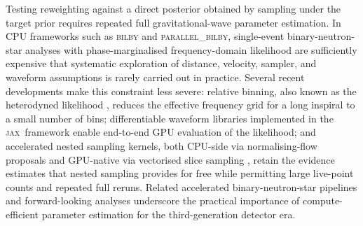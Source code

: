 \documentclass[usenatbib]{mnras}
\newcommand{\bilby}{\textsc{bilby}\xspace}
\newcommand{\pbilby}{\textsc{parallel\_bilby}\xspace}
\newcommand{\jax}{\textsc{jax}\xspace}
\begin{document}
Testing reweighting against a direct posterior obtained by sampling under the target prior requires repeated full gravitational-wave parameter estimation. In CPU frameworks such as \bilby \citep{Ashton2019Bilby} and \pbilby, single-event binary-neutron-star analyses with phase-marginalised frequency-domain likelihood are sufficiently expensive that systematic exploration of distance, velocity, sampler, and waveform assumptions is rarely carried out in practice. Several recent developments make this constraint less severe: relative binning, also known as the heterodyned likelihood \citep{Cornish2010,Zackay2018RelativeBinning}, reduces the effective frequency grid for a long inspiral to a small number of bins; differentiable waveform libraries \citep{Edwards2023Ripple} implemented in the \jax\ framework \citep{Bradbury2018JAX} enable end-to-end GPU evaluation of the likelihood; and accelerated nested sampling kernels, both CPU-side via normalising-flow proposals \citep{Williams2021Nessai} and GPU-native via vectorised slice sampling \citep{BlackJAX,Yallup2026BlackjaxNS}, retain the evidence estimates that nested sampling provides for free while permitting large live-point counts and repeated full reruns. Related accelerated binary-neutron-star pipelines \citep{Krishna2023RelativeBinningBilby,Wong2023Jim,Wouters2024JimBNS} and forward-looking analyses \citep{HuVeitch2025} underscore the practical importance of compute-efficient parameter estimation for the third-generation detector era.
\end{document}
